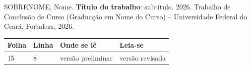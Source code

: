 \noindent SOBRENOME, Nome. \textbf{Título do trabalho}: subtítulo. 2026. Trabalho de Conclusão de Curso (Graduação em Nome do Curso) -- Universidade Federal do Ceará, Fortaleza, 2026.

\begin{center}
\begin{tabular}{p{1.5cm} p{1.5cm} p{4cm} p{4cm}}
\hline
\textbf{Folha} & \textbf{Linha} & \textbf{Onde se lê} & \textbf{Leia-se} \\
\hline
15 & 8 & versão preliminar & versão revisada \\
\hline
\end{tabular}
\end{center}
